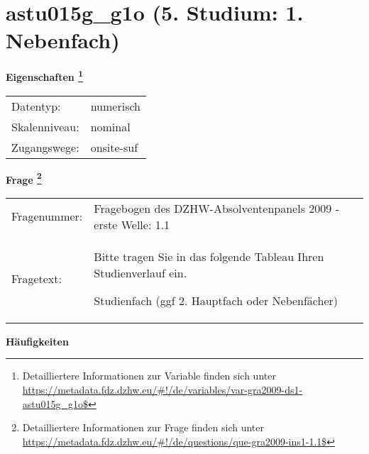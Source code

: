 
    \setcounter{footnote}{0}

    \vspace*{-1.8cm}
	\section{astu015g\_g1o (5. Studium: 1. Nebenfach)}
	\label{section:astu015g_g1o}



    \vspace*{0.5cm}
    \noindent\textbf{Eigenschaften
	\footnote{Detailliertere Informationen zur Variable finden sich unter
		\url{https://metadata.fdz.dzhw.eu/\#!/de/variables/var-gra2009-ds1-astu015g_g1o$}}}\\
	\begin{tabularx}{\hsize}{@{}lX}
	Datentyp: & numerisch \\
	Skalenniveau: & nominal \\
	Zugangswege: &
	  onsite-suf
 \\
    \end{tabularx}



				\vspace*{0.5cm}
                \noindent\textbf{Frage
	                \footnote{Detailliertere Informationen zur Frage finden sich unter
		              \url{https://metadata.fdz.dzhw.eu/\#!/de/questions/que-gra2009-ins1-1.1$}}}\\
				\begin{tabularx}{\hsize}{@{}lX}
					Fragenummer: &
					  Fragebogen des DZHW-Absolventenpanels 2009 - erste Welle:
					  1.1
 \\
					Fragetext: & Bitte tragen Sie in das folgende Tableau Ihren Studienverlauf ein.\par  Studienfach (ggf 2. Hauptfach oder Nebenfächer) \\
				\end{tabularx}





        		\vspace*{0.5cm}
                \noindent\textbf{Häufigkeiten}

